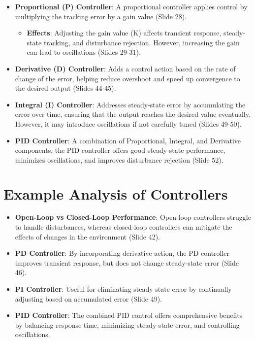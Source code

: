 \documentclass[
  14pt,
  a4paper,
  numbers=noendperiod,
  headinclude=true,
  footinclude=true,
  DIV=calc]{scrreprt}
\providecommand{\tightlist}{%
  \setlength{\itemsep}{0pt}\setlength{\parskip}{0pt}}\usepackage{longtable,booktabs,array}
\begin{document}
\begin{itemize}
\item
  \textbf{Proportional (P) Controller}: A proportional controller
  applies control by multiplying the tracking error by a gain value
  (Slide 28).

  \begin{itemize}
  \tightlist
  \item
    \textbf{Effects}: Adjusting the gain value (Κ) affects transient
    response, steady-state tracking, and disturbance rejection. However,
    increasing the gain can lead to oscillations (Slides 29-31).
  \end{itemize}
\item
  \textbf{Derivative (D) Controller}: Adds a control action based on the
  rate of change of the error, helping reduce overshoot and speed up
  convergence to the desired output (Slides 44-45).
\item
  \textbf{Integral (I) Controller}: Addresses steady-state error by
  accumulating the error over time, ensuring that the output reaches the
  desired value eventually. However, it may introduce oscillations if
  not carefully tuned (Slides 49-50).
\item
  \textbf{PID Controller}: A combination of Proportional, Integral, and
  Derivative components, the PID controller offers good steady-state
  performance, minimizes oscillations, and improves disturbance
  rejection (Slide 52).
\end{itemize}

\section{Example Analysis of
Controllers}\label{example-analysis-of-controllers}

\begin{itemize}
\item
  \textbf{Open-Loop vs Closed-Loop Performance}: Open-loop controllers
  struggle to handle disturbances, whereas closed-loop controllers can
  mitigate the effects of changes in the environment (Slide 42).
\item
  \textbf{PD Controller}: By incorporating derivative action, the PD
  controller improves transient response, but does not change
  steady-state error (Slide 46).
\item
  \textbf{PI Controller}: Useful for eliminating steady-state error by
  continually adjusting based on accumulated error (Slide 49).
\item
  \textbf{PID Controller}: The combined PID control offers comprehensive
  benefits by balancing response time, minimizing steady-state error,
  and controlling oscillations.
\end{itemize}
\end{document}
